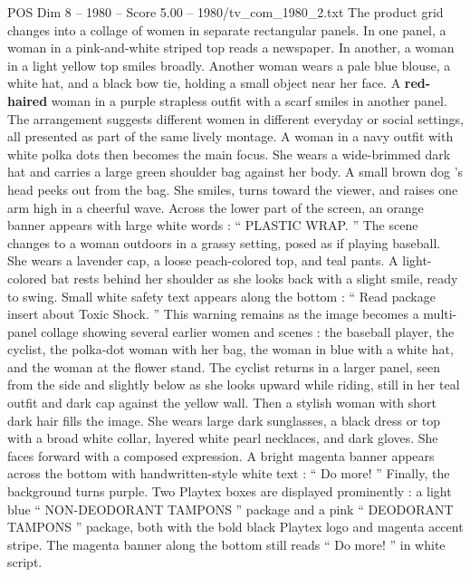 \begin{textsample}{POS Dim 8 – 1980 – Score 5.00 – 1980/tv\_com\_1980\_2.txt}
The product grid changes into a collage of women in separate rectangular panels.
In one panel, a woman in a pink-and-white striped top reads a newspaper.
In another, a woman in a light yellow top smiles broadly.
Another woman wears a pale blue blouse, a white hat, and a black bow tie, holding a small object near her face.
A \textbf{red-haired} woman in a purple strapless outfit with a scarf smiles in another panel.
The arrangement suggests different women in different everyday or social settings, all presented as part of the same lively montage.
A woman in a navy outfit with white polka dots then becomes the main focus.
She wears a wide-brimmed dark hat and carries a large green shoulder bag against her body.
A small brown dog ’s head peeks out from the bag.
She smiles, turns toward the viewer, and raises one arm high in a cheerful wave.
Across the lower part of the screen, an orange banner appears with large white words : “ PLASTIC WRAP. ” The scene changes to a woman outdoors in a grassy setting, posed as if playing baseball.
She wears a lavender cap, a loose peach-colored top, and teal pants.
A light-colored bat rests behind her shoulder as she looks back with a slight smile, ready to swing.
Small white safety text appears along the bottom : “ Read package insert about Toxic Shock. ” This warning remains as the image becomes a multi-panel collage showing several earlier women and scenes : the baseball player, the cyclist, the polka-dot woman with her bag, the woman in blue with a white hat, and the woman at the flower stand.
The cyclist returns in a larger panel, seen from the side and slightly below as she looks upward while riding, still in her teal outfit and dark cap against the yellow wall.
Then a stylish woman with short dark hair fills the image.
She wears large dark sunglasses, a black dress or top with a broad white collar, layered white pearl necklaces, and dark gloves.
She faces forward with a composed expression.
A bright magenta banner appears across the bottom with handwritten-style white text : “ Do more! ” Finally, the background turns purple.
Two Playtex boxes are displayed prominently : a light blue “ NON-DEODORANT TAMPONS ” package and a pink “ DEODORANT TAMPONS ” package, both with the bold black Playtex logo and magenta accent stripe.
The magenta banner along the bottom still reads “ Do more! ” in white script.

\end{textsample}
